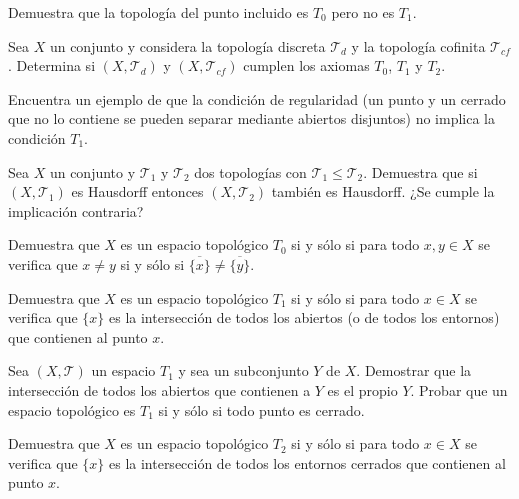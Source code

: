 \begin{ejer}[71]
Demuestra que la topología del punto incluido es $T_0$ pero no es $T_1$.
\end{ejer}

\begin{ejer}[72]
Sea $X$ un conjunto y considera la topología discreta $\mathcal{T}_d$ y la topología cofinita $\mathcal{T}_{cf}$. Determina si $(X, \mathcal{T}_d)$ y $(X, \mathcal{T}_{cf})$ cumplen los axiomas $T_0$, $T_1$ y $T_2$.
\end{ejer}

\begin{ejer}[73]
Encuentra un ejemplo de que la condición de regularidad (un punto y un cerrado que no lo contiene se pueden separar mediante abiertos disjuntos) no implica la condición $T_1$.
\end{ejer}

\begin{ejer}[74]
Sea $X$ un conjunto y $\mathcal{T}_1$ y $\mathcal{T}_2$ dos topologías con $\mathcal{T}_1 \le \mathcal{T}_2$. Demuestra que si $(X, \mathcal{T}_1)$ es Hausdorff entonces $(X, \mathcal{T}_2)$ también es Hausdorff. ¿Se cumple la implicación contraria?
\end{ejer}

\begin{ejer}[75]
Demuestra que $X$ es un espacio topológico $T_0$ si y sólo si para todo $x, y \in X$ se verifica que $x \neq y$ si y sólo si $\overline{\{x\}} \neq \overline{\{y\}}$.
\end{ejer}

\begin{ejer}[76]
Demuestra que $X$ es un espacio topológico $T_1$ si y sólo si para todo $x \in X$ se verifica que $\{x\}$ es la intersección de todos los abiertos (o de todos los entornos) que contienen al punto $x$.
\end{ejer}

\begin{ejer}[77]
Sea $(X, \mathcal{T})$ un espacio $T_1$ y sea un subconjunto $Y$ de $X$. Demostrar que la intersección de todos los abiertos que contienen a $Y$ es el propio $Y$. Probar que un espacio topológico es $T_1$ si y sólo si todo punto es cerrado.
\end{ejer}

\begin{ejer}[78]
Demuestra que $X$ es un espacio topológico $T_2$ si y sólo si para todo $x \in X$ se verifica que $\{x\}$ es la intersección de todos los entornos cerrados que contienen al punto $x$.
\end{ejer}


